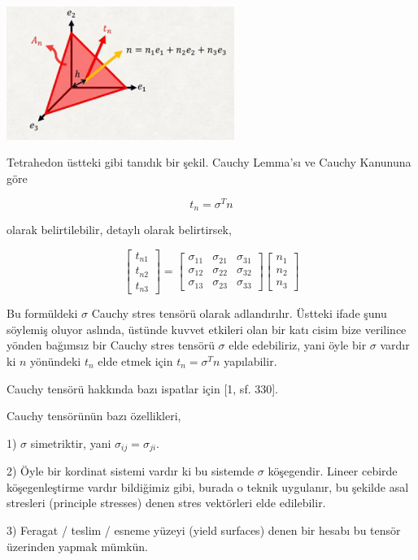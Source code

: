 \documentclass[12pt,fleqn]{article}\usepackage{../../common}
\begin{document}
\includegraphics[width=20em]{phy_020_strs_02_05.png}

Tetrahedon üstteki gibi tanıdık bir şekil. Cauchy Lemma'sı ve Cauchy Kanununa
göre

$$
t_n = \sigma^T n
$$

olarak belirtilebilir, detaylı olarak belirtirsek,

$$
\left[\begin{array}{ccc}
t_{n1} \\ t_{n2} \\ t_{n3} 
\end{array}\right] =
\left[\begin{array}{ccc}
\sigma_{11} & \sigma_{21} & \sigma_{31} \\
\sigma_{12} & \sigma_{22} & \sigma_{32} \\
\sigma_{13} & \sigma_{23} & \sigma_{33} 
\end{array}\right]
\left[\begin{array}{ccc}
n_1 \\ n_2 \\ n_3
\end{array}\right]
$$

Bu formüldeki $\sigma$ Cauchy stres tensörü olarak adlandırılır. Üstteki ifade
şunu söylemiş oluyor aslında, üstünde kuvvet etkileri olan bir katı cisim bize
verilince yönden bağımsız bir Cauchy stres tensörü $\sigma$ elde edebiliriz,
yani öyle bir $\sigma$ vardır ki $n$ yönündeki $t_n$ elde etmek için
$t_n = \sigma^T n$ yapılabilir.

Cauchy tensörü hakkında bazı ispatlar için [1, sf. 330]. 

Cauchy tensörünün bazı özellikleri,

1) $\sigma$ simetriktir, yani $\sigma_{ij} = \sigma_{ji}$.

2) Öyle bir kordinat sistemi vardır ki bu sistemde $\sigma$ köşegendir. Lineer
cebirde köşegenleştirme vardır bildiğimiz gibi, burada o teknik uygulanır, bu
şekilde asal stresleri (principle stresses) denen stres vektörleri elde
edilebilir.

3) Feragat / teslim / esneme yüzeyi (yield surfaces) denen bir hesabı bu tensör
üzerinden yapmak mümkün. 
\end{document}
